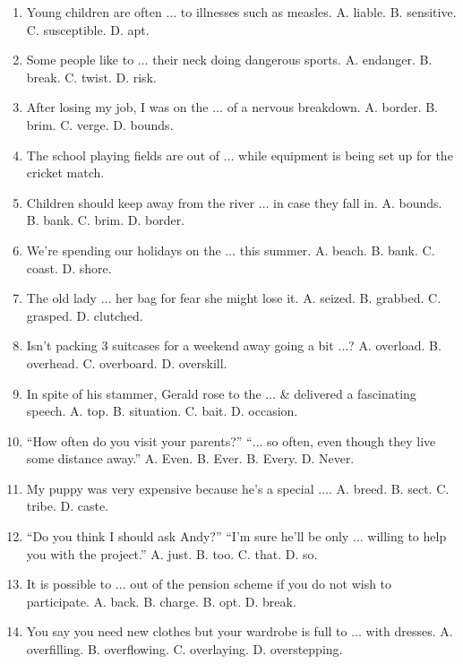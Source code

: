 \documentclass{article}
\numberwithin{equation}{section}
\begin{document}
\begin{enumerate}[leftmargin=2mm]
	\item Young children are often $\ldots$ to illnesses such as measles. {\sf A.} liable. {\sf B.} sensitive. {\sf C.} susceptible. {\sf D.} apt.
	\item Some people like to $\ldots$ their neck doing dangerous sports. {\sf A.} endanger. {\sf B.} break. {\sf C.} twist. {\sf D.} risk.
	\item After losing my job, I was on the $\ldots$ of a nervous breakdown. {\sf A.} border. {\sf B.} brim. {\sf C.} verge. {\sf D.} bounds.
	\item The school playing fields are out of $\ldots$ while equipment is being set up for the cricket match.
	\item Children should keep away from the river $\ldots$ in case they fall in. {\sf A.} bounds. {\sf B.} bank. {\sf C.} brim. {\sf D.} border.
	\item We're spending our holidays on the $\ldots$ this summer. {\sf A.} beach. {\sf B.} bank. {\sf C.} coast. {\sf D.} shore.
	\item The old lady $\ldots$ her bag for fear she might lose it. {\sf A.} seized. {\sf B.} grabbed. {\sf C.} grasped. {\sf D.} clutched.
	\item Isn't packing 3 suitcases for a weekend away going a bit $\ldots$? {\sf A.} overload. {\sf B.} overhead. {\sf C.} overboard. {\sf D.} overskill.
	\item In spite of his stammer, Gerald rose to the $\ldots$ \& delivered a fascinating speech. {\sf A.} top. {\sf B.} situation. {\sf C.} bait. {\sf D.} occasion.
	\item ``How often do you visit your parents?'' ``$\ldots$ so often, even though they live some distance away.'' {\sf A.} Even. {\sf B.} Ever. {\sf B.} Every. {\sf D.} Never.
	\item My puppy was very expensive because he's a special $\ldots$. {\sf A.} breed. {\sf B.} sect. {\sf C.} tribe. {\sf D.} caste.
	\item ``Do you think I should ask Andy?'' ``I'm sure he'll be only $\ldots$ willing to help you with the project.'' {\sf A.} just. {\sf B.} too. {\sf C.} that. {\sf D.} so.
	\item It is possible to $\ldots$ out of the pension scheme if you do not wish to participate. {\sf A.} back. {\sf B.} charge. {\sf B.} opt. {\sf D.} break.
	\item You say you need new clothes but your wardrobe is full to $\ldots$ with dresses. {\sf A.} overfilling. {\sf B.} overflowing. {\sf C.} overlaying. {\sf D.} overstepping.

\end{enumerate}
\end{document}
